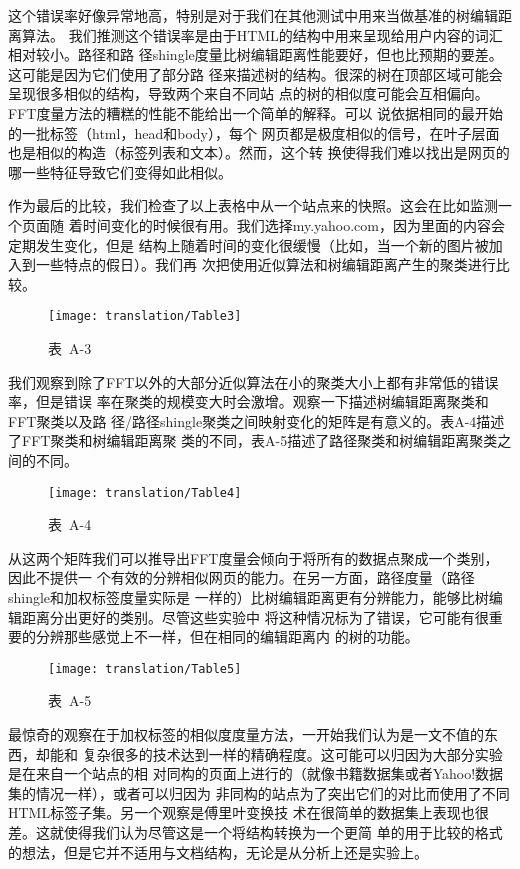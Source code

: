 这个错误率好像异常地高，特别是对于我们在其他测试中用来当做基准的树编辑距离算法。
我们推测这个错误率是由于HTML的结构中用来呈现给用户内容的词汇相对较小。路径和路
径shingle度量比树编辑距离性能要好，但也比预期的要差。这可能是因为它们使用了部分路
径来描述树的结构。很深的树在顶部区域可能会呈现很多相似的结构，导致两个来自不同站
点的树的相似度可能会互相偏向。FFT度量方法的糟糕的性能不能给出一个简单的解释。可以
说依据相同的最开始的一批标签（{html}，{head}和{body}），每个
网页都是极度相似的信号，在叶子层面也是相似的构造（标签列表和文本）。然而，这个转
换使得我们难以找出是网页的哪一些特征导致它们变得如此相似。

作为最后的比较，我们检查了以上表格中从一个站点来的快照。这会在比如监测一个页面随
着时间变化的时候很有用。我们选择my.yahoo.com，因为里面的内容会定期发生变化，但是
结构上随着时间的变化很缓慢（比如，当一个新的图片被加入到一些特点的假日）。我们再
次把使用近似算法和树编辑距离产生的聚类进行比较。
\begin{figure}[h]
\centering
\caption*{表~A-3}
  \texttt{[image: translation/Table3]}
\end{figure}

我们观察到除了FFT以外的大部分近似算法在小的聚类大小上都有非常低的错误率，但是错误
率在聚类的规模变大时会激增。观察一下描述树编辑距离聚类和FFT聚类以及路
径/路径shingle聚类之间映射变化的矩阵是有意义的。表A-4描述了FFT聚类和树编辑距离聚
类的不同，表A-5描述了路径聚类和树编辑距离聚类之间的不同。
\begin{figure}[h]
\centering
\caption*{表~A-4}
  \texttt{[image: translation/Table4]}
\end{figure}
从这两个矩阵我们可以推导出FFT度量会倾向于将所有的数据点聚成一个类别，因此不提供一
个有效的分辨相似网页的能力。在另一方面，路径度量（路径shingle和加权标签度量实际是
一样的）比树编辑距离更有分辨能力，能够比树编辑距离分出更好的类别。尽管这些实验中
将这种情况标为了错误，它可能有很重要的分辨那些感觉上不一样，但在相同的编辑距离内
的树的功能。
\begin{figure}[h]
  \centering
  \caption*{表~A-5}
  \texttt{[image: translation/Table5]}
\end{figure}

最惊奇的观察在于加权标签的相似度度量方法，一开始我们认为是一文不值的东西，却能和
复杂很多的技术达到一样的精确程度。这可能可以归因为大部分实验是在来自一个站点的相
对同构的页面上进行的（就像书籍数据集或者Yahoo!数据集的情况一样），或者可以归因为
非同构的站点为了突出它们的对比而使用了不同HTML标签子集。另一个观察是傅里叶变换技
术在很简单的数据集上表现也很差。这就使得我们认为尽管这是一个将结构转换为一个更简
单的用于比较的格式的想法，但是它并不适用与文档结构，无论是从分析上还是实验上。

